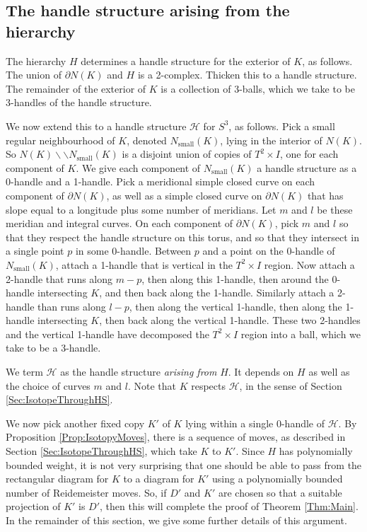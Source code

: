 \documentclass[oneside]{amsart}
\numberwithin{equation}{section}
\theoremstyle{plain}
\theoremstyle{definition}
\newcommand{\cut}{\backslash\backslash}
\newcommand{\calH}{\mathcal{H}}
\begin{document}
\subsection{The handle structure arising from the hierarchy}
\label{Subsec:HSFromHierarchy}

The hierarchy $H$ determines a handle structure for the exterior of $K$, as follows. The union of $\partial N(K)$ and $H$ is a
2-complex. Thicken this to a handle structure.
The remainder of the exterior of $K$ is a collection of 3-balls, which we take to be 3-handles of the handle structure.

We now extend this to a handle structure $\calH$ for $S^3$, as follows. Pick a small regular neighbourhood of $K$,
denoted $N_{\textrm{small}}(K)$, lying in the interior of $N(K)$. So $N(K) \cut N_{\textrm{small}}(K)$ is a disjoint union of copies of $T^2 \times I$,
one for each component of $K$.
We give each component of $N_{\textrm{small}}(K)$ a handle structure as a 0-handle and a 1-handle. Pick a meridional simple closed curve
on each component of $\partial N(K)$, as well as a simple closed curve on $\partial N(K)$ that has slope equal to a longitude plus some number of
meridians. Let $m$ and $l$ be these meridian and integral curves. On each component of $\partial N(K)$, pick $m$ and $l$ so that they respect the
handle structure on this torus, and so that they intersect in a single point $p$ in some 0-handle. Between $p$ and a point on the 0-handle of $N_{\textrm{small}}(K)$, 
attach a 1-handle that is vertical in the $T^2 \times I$ region. Now attach a 2-handle that runs along $m - p$, then along this 1-handle, then around the 0-handle intersecting $K$, and then back along the 1-handle. Similarly attach a 2-handle than runs along $l - p$, then along the vertical 1-handle,
then along the 1-handle intersecting $K$, then back along the vertical 1-handle. These two 2-handles and the vertical 1-handle have decomposed the $T^2 \times I$
region into a ball, which we take to be a 3-handle.

We term $\calH$ as the handle structure \emph{arising from} $H$. It depends on $H$ as well as the choice of curves $m$ and $l$.
Note that $K$ respects $\mathcal{H}$, in the sense of Section \ref{Sec:IsotopeThroughHS}.

We now pick another fixed copy $K'$ of $K$ lying within a single 0-handle of $\mathcal{H}$. By Proposition \ref{Prop:IsotopyMoves}, there
is a sequence of moves, as described in Section \ref{Sec:IsotopeThroughHS}, which take $K$ to $K'$. Since $H$ has polynomially bounded weight,
it is not very surprising that one should be able to pass from
the rectangular diagram for $K$ to a diagram for $K'$ using a polynomially bounded number of Reidemeister moves.
So, if $D'$ and $K'$ are chosen so that a suitable projection of $K'$ is $D'$, then this will complete the proof of Theorem \ref{Thm:Main}.
In the remainder of this section, we give some further details of this argument.
\end{document}
